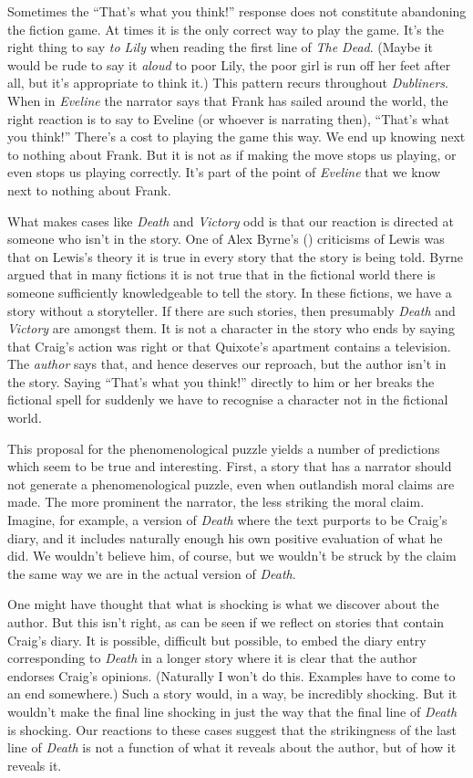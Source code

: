 \documentclass[
  10pt,
  letterpaper,
  DIV=11,
  numbers=noendperiod,
  twoside]{scrartcl}
\begin{document}
Sometimes the ``That's what you think!'' response does not constitute
abandoning the fiction game. At times it is the only correct way to play
the game. It's the right thing to say \emph{to Lily} when reading the
first line of \emph{The Dead}. (Maybe it would be rude to say it
\emph{aloud} to poor Lily, the poor girl is run off her feet after all,
but it's appropriate to think it.) This pattern recurs throughout
\emph{Dubliners}. When in \emph{Eveline} the narrator says that Frank
has sailed around the world, the right reaction is to say to Eveline (or
whoever is narrating then), ``That's what you think!'' There's a cost to
playing the game this way. We end up knowing next to nothing about
Frank. But it is not as if making the move stops us playing, or even
stops us playing correctly. It's part of the point of \emph{Eveline}
that we know next to nothing about Frank.

What makes cases like \emph{Death} and \emph{Victory} odd is that our
reaction is directed at someone who isn't in the story. One of Alex
Byrne's () criticisms of Lewis was that on
Lewis's theory it is true in every story that the story is being told.
Byrne argued that in many fictions it is not true that in the fictional
world there is someone sufficiently knowledgeable to tell the story. In
these fictions, we have a story without a storyteller. If there are such
stories, then presumably \emph{Death} and \emph{Victory} are amongst
them. It is not a character in the story who ends by saying that Craig's
action was right or that Quixote's apartment contains a television. The
\emph{author} says that, and hence deserves our reproach, but the author
isn't in the story. Saying ``That's what you think!'' directly to him or
her breaks the fictional spell for suddenly we have to recognise a
character not in the fictional world.

This proposal for the phenomenological puzzle yields a number of
predictions which seem to be true and interesting. First, a story that
has a narrator should not generate a phenomenological puzzle, even when
outlandish moral claims are made. The more prominent the narrator, the
less striking the moral claim. Imagine, for example, a version of
\emph{Death} where the text purports to be Craig's diary, and it
includes naturally enough his own positive evaluation of what he did. We
wouldn't believe him, of course, but we wouldn't be struck by the claim
the same way we are in the actual version of \emph{Death}.

One might have thought that what is shocking is what we discover about
the author. But this isn't right, as can be seen if we reflect on
stories that contain Craig's diary. It is possible, difficult but
possible, to embed the diary entry corresponding to \emph{Death} in a
longer story where it is clear that the author endorses Craig's
opinions. (Naturally I won't do this. Examples have to come to an end
somewhere.) Such a story would, in a way, be incredibly shocking. But it
wouldn't make the final line shocking in just the way that the final
line of \emph{Death} is shocking. Our reactions to these cases suggest
that the strikingness of the last line of \emph{Death} is not a function
of what it reveals about the author, but of how it reveals it.
\end{document}
